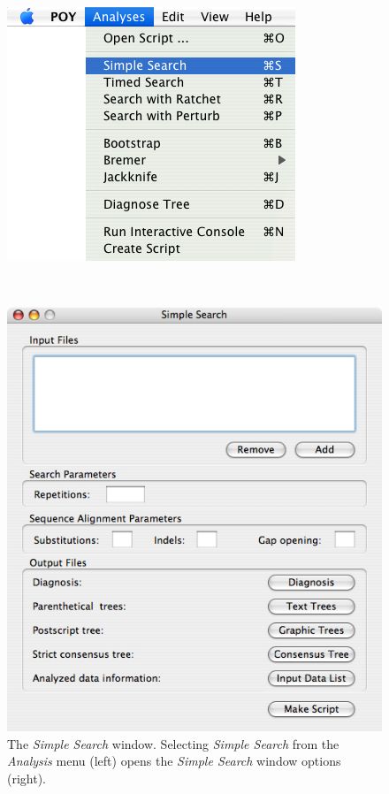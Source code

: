 \begin{figure}
\centering
\begin{minipage}[c]{0.45\textwidth}
   		\includegraphics[width=\textwidth]{doc/figures/simplesearch_menu.jpg}
\end{minipage}
\,
\begin{minipage}[c]{0.52\textwidth}
	   	\includegraphics[width=\textwidth]{doc/figures/simplesearch_window.jpg}
   	\end{minipage}
	
\caption{The \emph{Simple Search} window. Selecting \emph{Simple Search} from the \emph{Analysis} menu (left) 
opens the \emph{Simple Search} window options (right).}
\label{fig:simple_search_window}
\end{figure}

